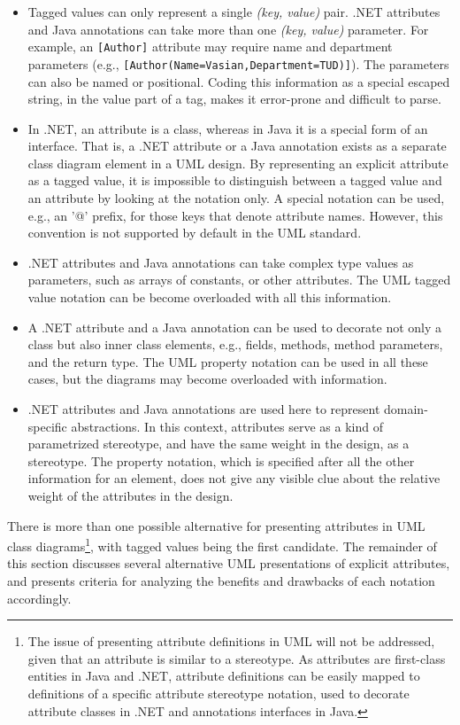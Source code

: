 \begin{itemize}
\item Tagged values can only represent a single \textit{\textit{(key, value)}}
  pair. .NET attributes and Java annotations can take more than one
  \textit{(key, value)} parameter. For example, an
  \texttt{[Au\-thor]} attribute may require name and department parameters
  (e.g., \texttt{[Au\-thor(Na\-me=Va\-sian,\-De\-part\-ment\-=TUD)]}). The parameters can
  also be named or positional. Coding this information as a special escaped
  string, in the value part of a tag, makes it error-prone and difficult to
  parse.

\item In .NET, an attribute is a class, whereas in Java it is a special form of
  an interface. That is, a .NET attribute or a Java annotation exists as a
  separate class diagram element in a UML design. By representing an explicit
  attribute as a tagged value, it is impossible to distinguish between a tagged
  value and an attribute by looking at the notation only. A special notation can be used, e.g., an '@' prefix, for those keys that denote attribute names. However, this convention is not supported by default in the UML standard.

\item .NET attributes and Java annotations can take complex type values as
  parameters, such as arrays of constants, or other attributes. The UML tagged
  value notation can be become overloaded with all this information.

\item A .NET attribute and a Java annotation can be used to decorate not only a
  class but also inner class elements, e.g., fields, methods, method parameters, and the return type. The UML property notation can be used in all these cases, but the
  diagrams may become overloaded with information.

\item .NET attributes and Java annotations are used here to
  represent domain-specific abstractions. In this context, attributes serve as a kind of parametrized stereotype, and have the same weight in the design, as a stereotype. The property notation, which is specified after all the other information for an element, does not give any visible clue about the relative weight of the attributes in the design.

\end{itemize}

There is more than one possible alternative for presenting attributes in UML class diagrams\footnote{The issue of presenting
attribute definitions in UML will not be addressed, given that an attribute is similar to a stereotype. As attributes are first-class entities in Java and .NET, attribute definitions can be easily mapped to definitions of a specific
\flqq{}attribute\frqq{} stereotype notation, used to decorate attribute
classes in .NET and annotations interfaces in Java.}, with tagged values being the first candidate. The remainder of this section discusses several alternative UML presentations of explicit attributes, and presents criteria for analyzing the benefits and drawbacks of each notation accordingly.


